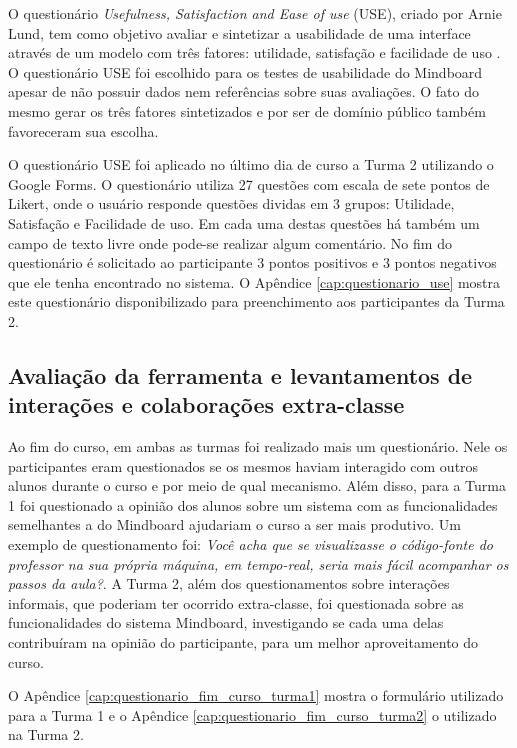 O questionário \emph{Usefulness, Satisfaction and Ease of use} (USE), criado por Arnie Lund, tem como objetivo avaliar e sintetizar a usabilidade de uma interface através de um modelo com três fatores: utilidade, satisfação e facilidade de uso \cite{useq}. O questionário USE foi escolhido para os testes de usabilidade do Mindboard apesar de não possuir dados nem referências sobre suas avaliações. O fato do mesmo gerar os três fatores sintetizados e por ser de domínio público também favoreceram sua escolha.

O questionário USE foi aplicado no último dia de curso a Turma 2 utilizando o Google Forms. O questionário utiliza 27 questões com escala de sete pontos de Likert, onde o usuário responde questões dividas em 3 grupos: Utilidade, Satisfação e Facilidade de uso. Em cada uma destas questões há também um campo de texto livre onde pode-se realizar algum comentário. No fim do questionário é solicitado ao participante 3 pontos positivos e 3 pontos negativos que ele tenha encontrado no sistema. O Apêndice \ref{cap:questionario_use} mostra este questionário disponibilizado para preenchimento aos participantes da Turma 2.

\subsection{Avaliação da ferramenta e levantamentos de interações e colaborações extra-classe}

Ao fim do curso, em ambas as turmas foi realizado mais um questionário. Nele os participantes eram questionados se os mesmos haviam interagido com outros alunos durante o curso e por meio de qual mecanismo. Além disso, para a Turma 1 foi questionado a opinião dos alunos sobre um sistema com as funcionalidades semelhantes a do Mindboard ajudariam o curso a ser mais produtivo. Um exemplo de questionamento foi: \emph{Você acha que se visualizasse o código-fonte do professor na sua própria máquina, em tempo-real, seria mais fácil acompanhar os passos da aula?}. A Turma 2, além dos questionamentos sobre interações informais, que poderiam ter ocorrido extra-classe, foi questionada sobre as funcionalidades do sistema Mindboard, investigando se cada uma delas contribuíram na opinião do participante, para um melhor aproveitamento do curso.

O Apêndice \ref{cap:questionario_fim_curso_turma1} mostra o formulário utilizado para a Turma 1 e o Apêndice \ref{cap:questionario_fim_curso_turma2} o utilizado na Turma 2.



